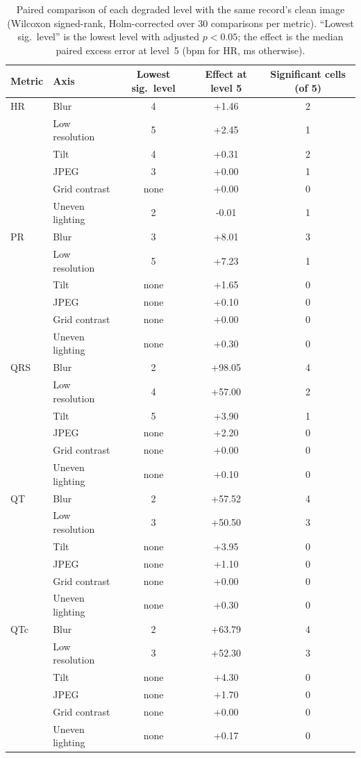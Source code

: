 \begin{table}[ht]
\centering\small
\caption{Paired comparison of each degraded level with the same record's clean image (Wilcoxon signed-rank, Holm-corrected over 30 comparisons per metric). ``Lowest sig.\ level'' is the lowest level with adjusted $p<0.05$; the effect is the median paired excess error at level~5 (bpm for HR, ms otherwise).}\label{tab:tests}
\begin{tabular}{@{}llccc@{}}
\toprule
Metric & Axis & Lowest sig.\ level & Effect at level 5 & Significant cells (of 5) \\
\midrule
HR & Blur & 4 & +1.46 & 2 \\
 & Low resolution & 5 & +2.45 & 1 \\
 & Tilt & 4 & +0.31 & 2 \\
 & JPEG & 3 & +0.00 & 1 \\
 & Grid contrast & none & +0.00 & 0 \\
 & Uneven lighting & 2 & -0.01 & 1 \\
\midrule
PR & Blur & 3 & +8.01 & 3 \\
 & Low resolution & 5 & +7.23 & 1 \\
 & Tilt & none & +1.65 & 0 \\
 & JPEG & none & +0.10 & 0 \\
 & Grid contrast & none & +0.00 & 0 \\
 & Uneven lighting & none & +0.30 & 0 \\
\midrule
QRS & Blur & 2 & +98.05 & 4 \\
 & Low resolution & 4 & +57.00 & 2 \\
 & Tilt & 5 & +3.90 & 1 \\
 & JPEG & none & +2.20 & 0 \\
 & Grid contrast & none & +0.00 & 0 \\
 & Uneven lighting & none & +0.10 & 0 \\
\midrule
QT & Blur & 2 & +57.52 & 4 \\
 & Low resolution & 3 & +50.50 & 3 \\
 & Tilt & none & +3.95 & 0 \\
 & JPEG & none & +1.10 & 0 \\
 & Grid contrast & none & +0.00 & 0 \\
 & Uneven lighting & none & +0.30 & 0 \\
\midrule
QTc & Blur & 2 & +63.79 & 4 \\
 & Low resolution & 3 & +52.30 & 3 \\
 & Tilt & none & +4.30 & 0 \\
 & JPEG & none & +1.70 & 0 \\
 & Grid contrast & none & +0.00 & 0 \\
 & Uneven lighting & none & +0.17 & 0 \\
\bottomrule
\end{tabular}
\end{table}